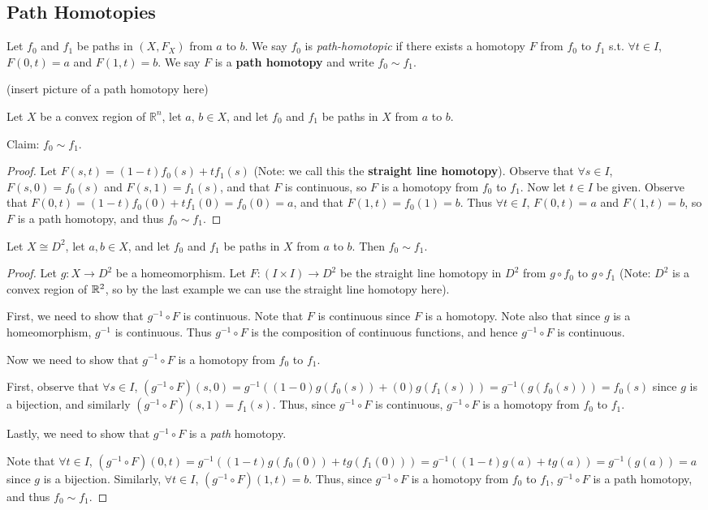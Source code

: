 \subsection{Path Homotopies} 
\begin{definition}
	Let $f_0$ and $f_1$ be paths in $(X, F_X)$ from $a$ to $b$. We say $f_0$ is \textit{path-homotopic} if there exists a homotopy $F$ from $f_0$ to $f_1$ s.t. $\forall t \in I$, $F(0,t) = a$ and $F(1, t) = b$. We say $F$ is a \textbf{path homotopy} and write $f_0 \sim f_1$. 
\end{definition}
(insert picture of a path homotopy here) \placeholder
\begin{example}
	Let $X$ be a convex region of $\mathbb{R}^n$, let $a$, $b \in X$, and let $f_0$ and $f_1$ be paths in $X$ from $a$ to $b$. 
\end{example}
Claim: $f_0 \sim f_1$. 
\begin{proof}
	Let $F(s,t) = (1-t)f_0(s) + tf_1(s)$ (Note: we call this the \textbf{straight line homotopy}). Observe that $\forall s \in I$, $F(s,0) = f_0(s)$ and $F(s,1) = f_1(s)$, and that $F$ is continuous, so $F$ is a homotopy from $f_0$ to $f_1$. Now let $t \in I$ be given. Observe that $F(0,t) = (1-t)f_0(0) + tf_1(0) = f_0(0) = a$, and that $F(1, t) = f_0(1) = b$. Thus $\forall t \in I$, $F(0,t) = a$ and $F(1,t) = b$, so $F$ is a path homotopy, and thus $f_0 \sim f_1$. 
\end{proof}
\begin{example}
	Let $X \cong D^2$, let $a, b \in X$, and let $f_0$ and $f_1$ be paths in $X$ from $a$ to $b$. Then $f_0 \sim f_1$. 
\end{example}
\begin{proof}
	Let $g: X \rightarrow D^2$ be a homeomorphism. Let $F: (I \times I) \rightarrow D^2$ be the straight line homotopy in $D^2$ from $g \circ f_0$ to $g \circ f_1$ (Note: $D^2$ is a convex region of $\mathbb R^2$, so by the last example we can use the straight line homotopy here).
	
	First, we need to show that $g^{-1} \circ F$ is continuous. Note that $F$ is continuous since $F$ is a homotopy. Note also that since $g$ is a homeomorphism, $g^{-1}$ is continuous. Thus $g^{-1} \circ F$ is the composition of continuous functions, and hence $g^{-1} \circ F$ is continuous.
	
	Now we need to show that $g^{-1} \circ F$ is a homotopy from $f_0$ to $f_1$.
	
	First, observe that $\forall s \in I$, $(g^{-1} \circ F)(s,0) = g^{-1}((1-0)g(f_0(s)) + (0)g(f_1(s))) = g^{-1}(g(f_0(s))) = f_0(s)$ since $g$ is a bijection, and similarly $(g^{-1} \circ F)(s, 1) = f_1(s)$. Thus, since $g^{-1} \circ F$ is continuous, $g^{-1} \circ F$ is a homotopy from $f_0$ to $f_1$.
	
	Lastly, we need to show that $g^{-1} \circ F$ is a \emph{path} homotopy.
	
	Note that $\forall t \in I$, $(g^{-1} \circ F)(0, t) = g^{-1}((1-t)g(f_0(0)) + tg(f_1(0))) = g^{-1}((1-t)g(a) + tg(a)) = g^{-1}(g(a)) = a$ since $g$ is a bijection. Similarly, $\forall t \in I$, $(g^{-1} \circ F)(1,t) = b$. Thus, since $g^{-1} \circ F$ is a homotopy from $f_0$ to $f_1$, $g^{-1} \circ F$ is a path homotopy, and thus $f_0 \sim f_1$. 
\end{proof}

